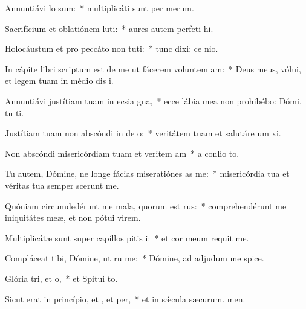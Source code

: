\item Annuntiávi  lo sum:~* multiplicáti sunt per merum.
\item Sacrifícium et oblatiónem luti:~* aures autem perfeti hi.
\item Holocáustum et pro peccáto non tuti:~* tunc dixi: ce nio.
\item In cápite libri scriptum est de me ut fácerem voluntem am:~* Deus meus, vólui, et legem tuam in médio dis i.
\item Annuntiávi justítiam tuam in ecsia gna,~* ecce lábia mea non prohibébo: Dómi, tu ti.
\item Justítiam tuam non abscóndi in de o:~* veritátem tuam et salutáre um xi.
\item Non abscóndi misericórdiam tuam et veritem am~* a conlio to.
\item Tu autem, Dómine, ne longe fácias miseratiónes as  me:~* misericórdia tua et véritas tua semper scerunt me.
\item Quóniam circumdedérunt me mala, quorum  est rus:~* comprehendérunt me iniquitátes meæ, et non pótui  virem.
\item Multiplicátæ sunt super capíllos pitis i:~* et cor meum requit me.
\item Compláceat tibi, Dómine, ut ru me:~* Dómine, ad adjudum me spice.
\item Glória tri, et o,~* et Spitui to.
\item Sicut erat in princípio, et , et per,~* et in sǽcula sæcurum. men.
